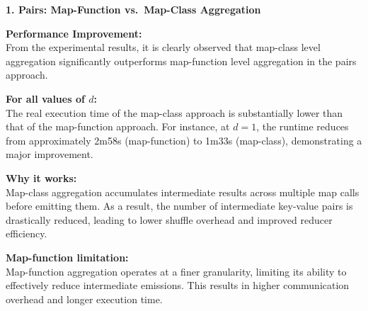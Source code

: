\documentclass[12pt,a4paper]{article}
\begin{document}
\begin{infobox}
  \textbf{1. Pairs: Map-Function vs.\ Map-Class Aggregation}
  \vspace{0.5em}
  
  \textbf{Performance Improvement:} \\
  From the experimental results, it is clearly observed that map-class level aggregation significantly outperforms map-function level aggregation in the pairs approach.
  \vspace{0.5em}
  
  \textbf{For all values of $d$:} \\
  The real execution time of the map-class approach is substantially lower than that of the map-function approach. For instance, at $d = 1$, the runtime reduces from approximately 2m58s (map-function) to 1m33s (map-class), demonstrating a major improvement.
  \vspace{0.5em}
  
  \textbf{Why it works:} \\
  Map-class aggregation accumulates intermediate results across multiple map calls before emitting them. As a result, the number of intermediate key-value pairs is drastically reduced, leading to lower shuffle overhead and improved reducer efficiency.
  \vspace{0.5em}
  
  \textbf{Map-function limitation:} \\
  Map-function aggregation operates at a finer granularity, limiting its ability to effectively reduce intermediate emissions. This results in higher communication overhead and longer execution time.
\end{infobox}
\vspace{0.5em}
\end{document}
